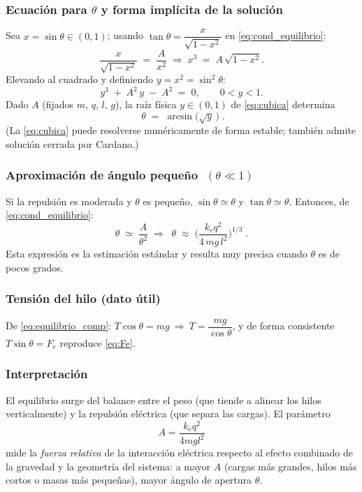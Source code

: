 \documentclass{article}
\begin{document}
\subsubsection*{Ecuación para $\theta$ y forma implícita de la solución}
Sea $x=\sin\theta\in(0,1)$; usando $\tan\theta=\dfrac{x}{\sqrt{1-x^2}}$ en \eqref{eq:cond_equilibrio}:
\begin{equation}\label{eq:x_equation}
\frac{x}{\sqrt{1-x^2}} \;=\; \frac{A}{x^2}
\;\Longrightarrow\;
x^3 \;=\; A\,\sqrt{1-x^2}.
\end{equation}
Elevando al cuadrado y definiendo $y=x^2=\sin^2\theta$:
\begin{equation}\label{eq:cubica}
y^3 \;+\; A^2\,y \;-\; A^2 \;=\; 0,
\qquad 0<y<1.
\end{equation}
Dado $A$ (fijados $m,\,q,\,l,\,g$), la raíz física $y\in(0,1)$ de \eqref{eq:cubica} determina
\[
\boxed{\;\theta \;=\; \arcsin\!\big(\sqrt{y}\,\big)\;}.
\]
(La \eqref{eq:cubica} puede resolverse numéricamente de forma estable; también admite solución cerrada por Cardano.)

\subsubsection*{Aproximación de ángulo pequeño $\;(\theta\ll 1)$}
Si la repulsión es moderada y $\theta$ es pequeño, $\sin\theta\simeq\theta$ y $\tan\theta\simeq\theta$. Entonces, de \eqref{eq:cond_equilibrio}:
\begin{equation}\label{eq:small_angle}
\theta \;\simeq\; \frac{A}{\theta^2}
\;\Longrightarrow\;
\boxed{\;\theta \;\approx\; \Big(\frac{k_e q^2}{4\,m g\,l^2}\Big)^{\!1/3}\;}.
\end{equation}
Esta expresión es la estimación estándar y resulta muy precisa cuando $\theta$ es de pocos grados.

\subsubsection*{Tensión del hilo (dato útil)}
De \eqref{eq:equilibrio_comp}: $T\cos\theta=mg\ \Rightarrow\ T=\dfrac{mg}{\cos\theta}$, y de forma consistente $T\sin\theta=F_e$ reproduce \eqref{eq:Fe}.

\subsubsection*{Interpretación}
El equilibrio surge del balance entre el peso (que tiende a alinear los hilos verticalmente) y la repulsión eléctrica (que separa las cargas). El parámetro
\[
A=\frac{k_e q^2}{4mgl^2}
\]
mide la \emph{fuerza relativa} de la interacción eléctrica respecto al efecto combinado de la gravedad y la geometría del sistema: a mayor $A$ (cargas más grandes, hilos más cortos o masas más pequeñas), mayor ángulo de apertura $\theta$.
\end{document}

